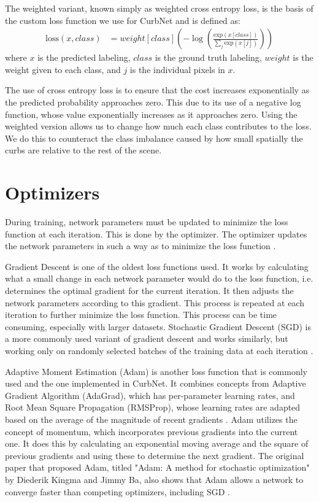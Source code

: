 The weighted variant, known simply as weighted cross entropy loss, is the basis of the custom loss function we use for CurbNet and is defined as:
\begin{align}
	\text{loss}(x, class) &= weight[class]\left(-\log\left(\frac{\text{exp}(x[class])}{\sum_{j}\text{exp}(x[j])}\right)\right)
\end{align}
where $x$ is the predicted labeling, $class$ is the ground truth labeling, $weight$ is the weight given to each class, and $j$ is the individual pixels in $x$.

The use of cross entropy loss is to ensure that the cost increases exponentially as the predicted probability approaches zero.
This due to its use of a negative log function, whose value exponentially increases as it approaches zero.
Using the weighted version allows us to change how much each class contributes to the loss.
We do this to counteract the class imbalance caused by how small spatially the curbs are relative to the rest of the scene.

\section{Optimizers}\label{section:background-optimizers}
During training, network parameters must be updated to minimize the loss function at each iteration.
This is done by the optimizer.
The optimizer updates the network parameters in such a way as to minimize the loss function \cite{optimizer-intro}.

Gradient Descent is one of the oldest loss functions used.
It works by calculating what a small change in each network parameter would do to the loss function, i.e. determines the optimal gradient for the current iteration.
It then adjusts the network parameters according to this gradient.
This process is repeated at each iteration to further minimize the loss function.
This process can be time consuming, especially with larger datasets.
Stochastic Gradient Descent (SGD) is a more commonly used variant of gradient descent and works similarly, but working only on randomly selected batches of the training data at each iteration \cite{optimizer-intro}.

Adaptive Moment Estimation (Adam) is another loss function that is commonly used and the one implemented in CurbNet.
It combines concepts from Adaptive Gradient Algorithm (AdaGrad), which has per-parameter learning rates, and Root Mean Square Propagation (RMSProp), whose learning rates are adapted based on the average of the magnitude of recent gradients \cite{adam}.
Adam utilizes the concept of momentum, which incorporates previous gradients into the current one.
It does this by calculating an exponential moving average and the square of previous gradients and using these to determine the next gradient.
The original paper that proposed Adam, titled "Adam: A method for stochastic optimization" by Diederik Kingma and Jimmy Ba, also shows that Adam allows a network to converge faster than competing optimizers, including SGD \cite{adam}.

